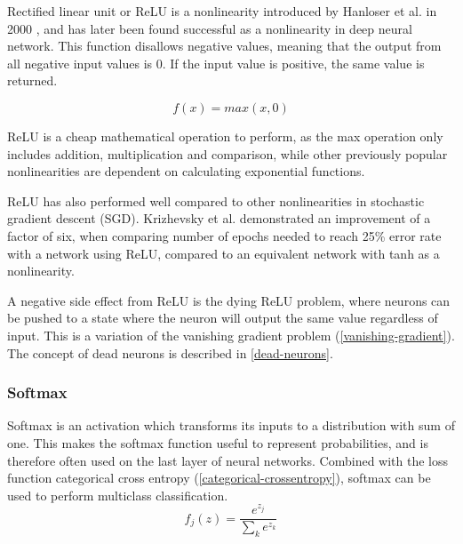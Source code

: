 Rectified linear unit or ReLU is a nonlinearity introduced by Hanloser et al. in 2000 \cite{smith_scientist_1997}, and has later been found successful as a nonlinearity in deep neural network. This function disallows negative values, meaning that the output from all negative input values is 0. If the input value is positive, the same value is returned.


\begin{equation} \label{eqn:relu}
    f(x) = max(x, 0)
\end{equation}

ReLU is a cheap mathematical operation to perform, as the max operation only includes addition, multiplication and comparison, while other previously popular nonlinearities are dependent on calculating exponential functions. 

ReLU has also performed well compared to other nonlinearities in stochastic gradient descent (SGD). Krizhevsky et al. demonstrated an improvement of a factor of six, when comparing number of epochs needed to reach 25\% error rate with a network using ReLU, compared to an equivalent network with tanh as a nonlinearity. \cite{krizhevsky_imagenet_2012}

A negative side effect from ReLU is the dying ReLU problem, where neurons can be pushed to a state where the neuron will output the same value regardless of input. This is a variation of the vanishing gradient problem (\ref{vanishing-gradient}). The concept of dead neurons is described in \ref{dead-neurons}. \cite{zeiler_rectified_2013}

\subsubsection{Softmax}

Softmax is an activation which transforms its inputs to a distribution with sum of one. This makes the softmax function useful to represent probabilities, and is therefore often used on the last layer of neural networks. Combined with the loss function categorical cross entropy (\ref{categorical-crossentropy}), softmax can be used to perform multiclass classification. \cite{_cs231n_????-1}
\begin{equation} \label{eqn:softmax}
    f_j(z) = \frac{e^{z_j}}{\sum_k e^{z_k}}
\end{equation}

